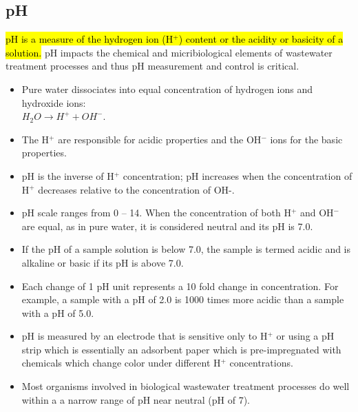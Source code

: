 \subsection{pH}	
			\hl{pH is a measure of the hydrogen ion (H$^+$) content or the acidity or basicity of a solution.}  pH impacts the chemical and micribiological elements of wastewater treatment processes and thus pH measurement and control is critical.
			\begin{itemize}
				\item Pure water dissociates into equal concentration of hydrogen ions and hydroxide ions:\\ 
				      $H_2O \rightarrow H^+ + OH^-$.
				\item The H$^+$ are responsible for acidic properties and the OH$^-$ ions for the basic properties.  
				\item pH is the inverse of H$^+$ concentration; pH increases when the concentration of H$^+$ decreases relative to the concentration of OH-. 
				\item pH scale ranges from 0 – 14. When the concentration of both H$^+$ and OH$^-$ are equal, as in pure water, it is considered neutral and its pH is 7.0.  \item If the pH of a sample solution is below 7.0, the sample is termed acidic and is alkaline or basic if its pH is above 7.0. 
				\item Each change of 1 pH unit represents a 10 fold change in concentration.  For example, a sample with a pH of 2.0 is 1000 times more acidic than a sample with a pH of 5.0. 
				\item pH is measured by an electrode that is sensitive only to H$^+$ or using a pH strip which is essentially an adsorbent paper which is pre-impregnated with chemicals which change color under different H$^+$ concentrations.
				\item Most organisms involved in biological wastewater treatment processes do well within a a narrow range of pH near neutral (pH of 7).			
			\end{itemize}
			
